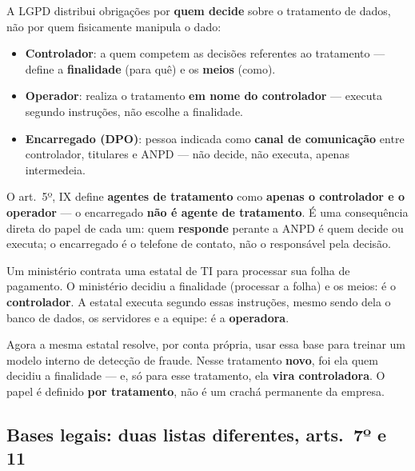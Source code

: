 \begin{conceito}
A LGPD distribui obrigações por \textbf{quem decide} sobre o tratamento de
dados, não por quem fisicamente manipula o dado:

\begin{itemize}
\item \textbf{Controlador}: a quem competem as decisões referentes ao
tratamento --- define a \textbf{finalidade} (para quê) e os \textbf{meios}
(como).
\item \textbf{Operador}: realiza o tratamento \textbf{em nome do
controlador} --- executa segundo instruções, não escolhe a finalidade.
\item \textbf{Encarregado (DPO)}: pessoa indicada como \textbf{canal de
comunicação} entre controlador, titulares e ANPD --- não decide, não
executa, apenas intermedeia.
\end{itemize}

O art.\ 5º, IX define \textbf{agentes de tratamento} como \textbf{apenas o
controlador e o operador} --- o encarregado \textbf{não é agente de
tratamento}. É uma consequência direta do papel de cada um: quem
\textbf{responde} perante a ANPD é quem decide ou executa; o encarregado é
o telefone de contato, não o responsável pela decisão.
\end{conceito}

\begin{exemplo}
Um ministério contrata uma estatal de TI para processar sua folha de
pagamento. O ministério decidiu a finalidade (processar a folha) e os
meios: é o \textbf{controlador}. A estatal executa segundo essas
instruções, mesmo sendo dela o banco de dados, os servidores e a equipe: é
a \textbf{operadora}.

Agora a mesma estatal resolve, por conta própria, usar essa base para
treinar um modelo interno de detecção de fraude. Nesse tratamento
\textbf{novo}, foi ela quem decidiu a finalidade --- e, só para esse
tratamento, ela \textbf{vira controladora}. O papel é definido \textbf{por
tratamento}, não é um crachá permanente da empresa.
\end{exemplo}

\subsection{Bases legais: duas listas diferentes, arts.\ 7º e 11}

